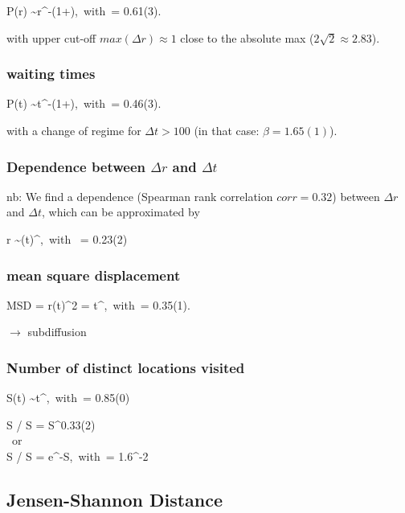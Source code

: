 \be
P(\Delta r) \sim r^{-(1+\alpha)},~with~\alpha = 0.61(3).
\ee

with upper cut-off $max(\Delta r) \approx 1$ close to the absolute max ($2\sqrt{2} \approx 2.83$).

\subsubsection{waiting times}

\be
P(\Delta t) \sim t^{-(1+\beta)},~with~\beta = 0.46(3).
\ee

with a change of regime for $\Delta t > 100$ (in that case: $\beta = 1.65(1)$).

\subsubsection{Dependence between $\Delta r$ and $\Delta t$}

nb: We find a dependence (Spearman rank correlation $corr = 0.32$) between  $\Delta r$ and $\Delta t$, which can be approximated by

\be
\Delta r \sim {(\Delta t)}^{\nu},~with ~\nu = 0.23(2)
\ee


\subsubsection{mean square displacement}

\be
MSD = \langle r(t)^2 \rangle = t^{\gamma},~with~\gamma = 0.35(1).
\ee

$\rightarrow$ subdiffusion

\subsubsection{Number of distinct locations visited}

\be
S(t) \sim t^{\mu},~with~\mu = 0.85(0)
\ee

\begin{center}
\ba
\Delta S / \langle S \rangle = S^{0.33(2)}\\
~or~\\
\Delta S / \langle S \rangle = e^{-\lambda S},~with~\lambda = 1.6^{-2}
\ea
\end{center}



\clearpage



\subsection{Jensen-Shannon Distance}


